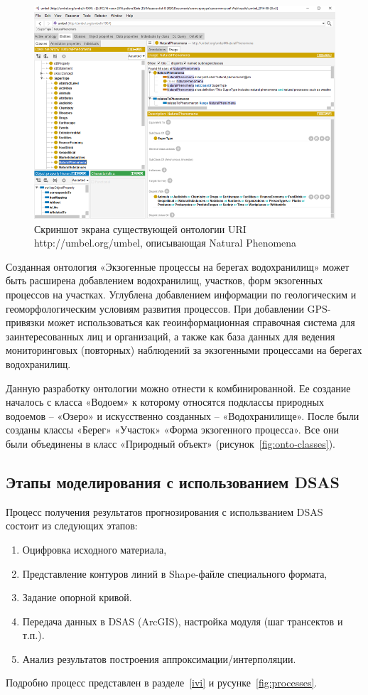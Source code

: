 \documentclass[732,14pt,final]{studrep}
\begin{document}
  \begin{figure}[htp]
	\centering
	\includegraphics[width=0.9\linewidth]{pics/image14.png}
    \caption{Скриншот экрана существующей онтологии URI http://umbel.org/umbel, описывающая Natural Phenomena}
    \label{fig:umbel}
  \end{figure}

Созданная онтология «Экзогенные процессы на берегах водохранилищ» может быть расширена добавлением водохранилищ, участков, форм экзогенных процессов на участках. Углублена добавлением информации по геологическим и геоморфологическим условиям развития процессов. При добавлении GPS-привязки может использоваться как геоинформационная справочная система для заинтересованных лиц и организаций, а также как база данных для ведения мониторинговых (повторных) наблюдений за экзогенными процессами на берегах водохранилищ.

Данную разработку онтологии можно отнести к комбинированной. Ее создание началось с класса «Водоем» к которому относятся подклассы природных водоемов – «Озеро» и искусственно созданных – «Водохранилище». После были созданы классы «Берег» «Участок» «Форма экзогенного процесса». Все они были объединены в класс «Природный объект» (рисунок~\ref{fig:onto-classes}).

\subsection{Этапы моделирования с использованием DSAS}
\label{sec:model-stages}

Процесс получения результатов прогнозирования с использванием DSAS~\cite{isha20} состоит из следующих этапов:
\begin{enumerate}
\item Оцифровка исходного материала,
\item Представление контуров линий в Shape-файле специального формата,
\item Задание опорной кривой.
\item Передача данных в DSAS (ArcGIS), настройка модуля (шаг трансектов и т.п.).
\item Анализ результатов построения аппроксимации/интерполяции.
\end{enumerate}
Подробно процесс представлен в разделе~\ref{ivi} и русунке~\ref{fig:processes}.
\end{document}
